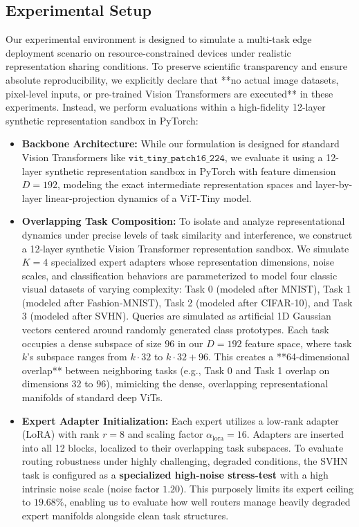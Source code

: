 \subsection{Experimental Setup}
Our experimental environment is designed to simulate a multi-task edge deployment scenario on resource-constrained devices under realistic representation sharing conditions. To preserve scientific transparency and ensure absolute reproducibility, we explicitly declare that **no actual image datasets, pixel-level inputs, or pre-trained Vision Transformers are executed** in these experiments. Instead, we perform evaluations within a high-fidelity 12-layer synthetic representation sandbox in PyTorch:
\begin{itemize}
    \item \textbf{Backbone Architecture:} While our formulation is designed for standard Vision Transformers like $\mathtt{vit\_tiny\_patch16\_224}$, we evaluate it using a 12-layer synthetic representation sandbox in PyTorch with feature dimension $D=192$, modeling the exact intermediate representation spaces and layer-by-layer linear-projection dynamics of a ViT-Tiny model.
    \item \textbf{Overlapping Task Composition:} To isolate and analyze representational dynamics under precise levels of task similarity and interference, we construct a 12-layer synthetic Vision Transformer representation sandbox. We simulate $K=4$ specialized expert adapters whose representation dimensions, noise scales, and classification behaviors are parameterized to model four classic visual datasets of varying complexity: Task 0 (modeled after MNIST), Task 1 (modeled after Fashion-MNIST), Task 2 (modeled after CIFAR-10), and Task 3 (modeled after SVHN). Queries are simulated as artificial 1D Gaussian vectors centered around randomly generated class prototypes. Each task occupies a dense subspace of size $96$ in our $D=192$ feature space, where task $k$'s subspace ranges from $k \cdot 32$ to $k \cdot 32 + 96$. This creates a **64-dimensional overlap** between neighboring tasks (e.g., Task 0 and Task 1 overlap on dimensions $32$ to $96$), mimicking the dense, overlapping representational manifolds of standard deep ViTs.
    \item \textbf{Expert Adapter Initialization:} Each expert utilizes a low-rank adapter (LoRA) with rank $r=8$ and scaling factor $\alpha_{\text{lora}}=16$. Adapters are inserted into all 12 blocks, localized to their overlapping task subspaces. To evaluate routing robustness under highly challenging, degraded conditions, the SVHN task is configured as a \textbf{specialized high-noise stress-test} with a high intrinsic noise scale (noise factor $1.20$). This purposely limits its expert ceiling to $19.68\%$, enabling us to evaluate how well routers manage heavily degraded expert manifolds alongside clean task structures.

\end{itemize}
